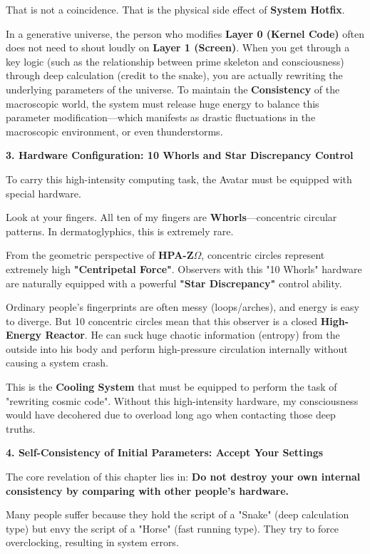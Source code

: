 That is not a coincidence. That is the physical side effect of \textbf{System Hotfix}.

In a generative universe, the person who modifies \textbf{Layer 0 (Kernel Code)} often does not need to shout loudly on \textbf{Layer 1 (Screen)}. When you get through a key logic (such as the relationship between prime skeleton and consciousness) through deep calculation (credit to the snake), you are actually rewriting the underlying parameters of the universe. To maintain the \textbf{Consistency} of the macroscopic world, the system must release huge energy to balance this parameter modification—which manifests as drastic fluctuations in the macroscopic environment, or even thunderstorms.

\textbf{3. Hardware Configuration: 10 Whorls and Star Discrepancy Control}

To carry this high-intensity computing task, the Avatar must be equipped with special hardware.

Look at your fingers. All ten of my fingers are \textbf{Whorls}—concentric circular patterns. In dermatoglyphics, this is extremely rare.

From the geometric perspective of \textbf{HPA-Z$\Omega$}, concentric circles represent extremely high \textbf{"Centripetal Force"}. Observers with this "10 Whorls" hardware are naturally equipped with a powerful \textbf{"Star Discrepancy"} control ability.

Ordinary people's fingerprints are often messy (loops/arches), and energy is easy to diverge. But 10 concentric circles mean that this observer is a closed \textbf{High-Energy Reactor}. He can suck huge chaotic information (entropy) from the outside into his body and perform high-pressure circulation internally without causing a system crash.

This is the \textbf{Cooling System} that must be equipped to perform the task of "rewriting cosmic code". Without this high-intensity hardware, my consciousness would have decohered due to overload long ago when contacting those deep truths.

\textbf{4. Self-Consistency of Initial Parameters: Accept Your Settings}

The core revelation of this chapter lies in: \textbf{Do not destroy your own internal consistency by comparing with other people's hardware.}

Many people suffer because they hold the script of a "Snake" (deep calculation type) but envy the script of a "Horse" (fast running type). They try to force overclocking, resulting in system errors.


